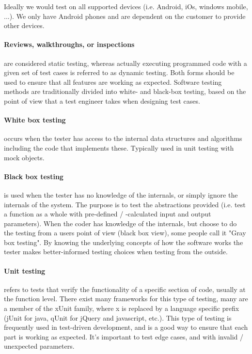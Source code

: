 Ideally we would test on all supported devices (i.e. Android,
iOs, windows mobile, ...). We only have Android phones and are dependent on the
customer to provide other devices.

\paragraph{Reviews, walkthroughs, or inspections} are considered static testing, whereas
actually executing programmed code with a given set of test cases is referred to
as dynamic testing. Both forms should be used to ensure that all features are
working as expected.
\newline
Software testing methods are traditionally divided into white- and black-box
testing, based on the point of view that a test engineer takes when designing
test cases.

\paragraph{White box testing} occurs when the tester has access to the internal data
structures and algorithms including the code that implements these. Typically
used in unit testing with mock objects.

\paragraph{Black box testing} is used when the tester has no knowledge of the internals, or
simply ignore the internals of the system. The purpose is to test the
abstractions provided (i.e. test a function as a whole with
pre-defined / -calculated input and output parameters). When the coder has knowledge of the internals, but choose to do the testing from
a users point of view (black box view), some people call it "Gray box testing".
By knowing the underlying concepts of how the software works the tester makes
better-informed testing choices when testing from the outside.

\paragraph{Unit testing} refers to tests that verify the functionality of a specific section
of code, usually at the function level. There exist many frameworks for this
type of testing, many are a member of the xUnit family, where x is replaced by a
language specific prefix (jUnit for java, qUnit for jQuery and javascript, etc.).
This type of testing is frequently used in test-driven development, and is a
good way to ensure that each part is working as expected. It's important to test
edge cases, and with invalid / unexpected parameters.

